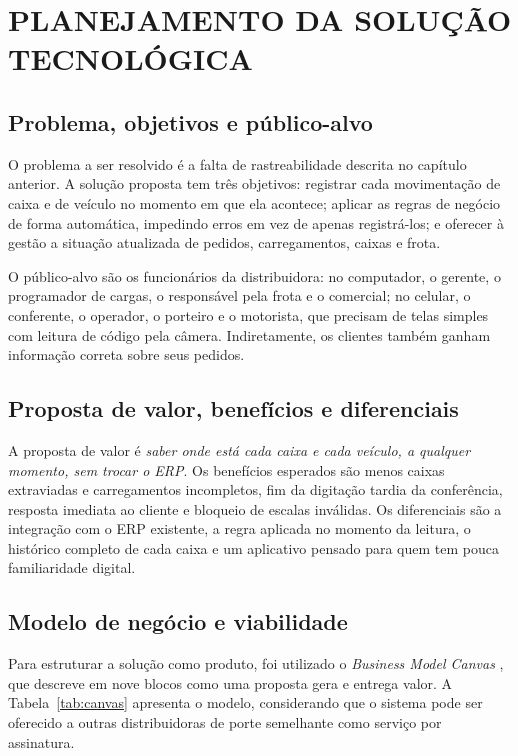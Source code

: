 \chapter{PLANEJAMENTO DA SOLUÇÃO TECNOLÓGICA}

\section{Problema, objetivos e público-alvo}

O problema a ser resolvido é a falta de rastreabilidade descrita no capítulo anterior. A solução proposta tem três objetivos: registrar cada movimentação de caixa e de veículo no momento em que ela acontece; aplicar as regras de negócio de forma automática, impedindo erros em vez de apenas registrá-los; e oferecer à gestão a situação atualizada de pedidos, carregamentos, caixas e frota.

O público-alvo são os funcionários da distribuidora: no computador, o gerente, o programador de cargas, o responsável pela frota e o comercial; no celular, o conferente, o operador, o porteiro e o motorista, que precisam de telas simples com leitura de código pela câmera. Indiretamente, os clientes também ganham informação correta sobre seus pedidos.

\section{Proposta de valor, benefícios e diferenciais}

A proposta de valor é \textit{saber onde está cada caixa e cada veículo, a qualquer momento, sem trocar o ERP}. Os benefícios esperados são menos caixas extraviadas e carregamentos incompletos, fim da digitação tardia da conferência, resposta imediata ao cliente e bloqueio de escalas inválidas. Os diferenciais são a integração com o ERP existente, a regra aplicada no momento da leitura, o histórico completo de cada caixa e um aplicativo pensado para quem tem pouca familiaridade digital.

\section{Modelo de negócio e viabilidade}

Para estruturar a solução como produto, foi utilizado o \textit{Business Model Canvas} \cite{osterwalder2011}, que descreve em nove blocos como uma proposta gera e entrega valor. A Tabela~\ref{tab:canvas} apresenta o modelo, considerando que o sistema pode ser oferecido a outras distribuidoras de porte semelhante como serviço por assinatura.

